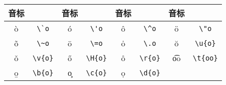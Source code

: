 \begin{table}[H]
\centering
\begin{tabular}{|*{8}{c|}}\hline
音标 &  &音标 &  &音标 & &音标 &  \\
\hline
\`o & \verb|\`o| &
\'o & \verb|\'o| &
\^o & \verb|\^o| &
\"o & \verb|\"o| \\\hline
\~o & \verb|\~o| &
\=o & \verb|\=o| &
\.o & \verb|\.o| &
\u{o} & \verb|\u{o}| \\\hline
\v{o} & \verb|\v{o}| &
\H{o} & \verb|\H{o}| &
\r{o} & \verb|\r{o}| &
\t{oo} & \verb|\t{oo}| \\\hline
\b{o} & \verb|\b{o}| &
\c{o} & \verb|\c{o}| &
\d{o} & \verb|\d{o}| &
& \\\hline
\end{tabular}
\end{table}